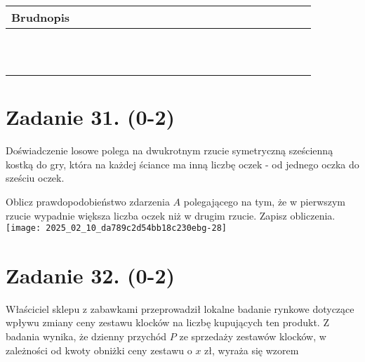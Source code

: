 \documentclass[10pt]{article}
\begin{document}
\begin{center}
\begin{tabular}{|c|c|c|c|c|c|c|c|c|c|c|c|c|c|c|c|c|c|c|c|c|c|c|c|c|}
\hline
\multicolumn{4}{|l|}{Brudnopis} &  &  &  &  &  &  &  &  &  &  &  &  &  &  &  &  &  &  &  &  &  \\
\hline
 &  &  &  &  &  &  &  &  &  &  &  &  &  &  &  &  &  &  &  &  &  &  &  &  \\
\hline
 &  &  &  &  &  &  &  &  &  &  &  &  &  &  &  &  &  &  &  &  &  &  &  &  \\
\hline
 &  &  &  &  &  &  &  &  &  &  &  &  &  &  &  &  &  &  &  &  &  &  &  &  \\
\hline
 &  &  &  &  &  &  &  &  &  &  &  &  &  &  &  &  &  &  &  &  &  &  &  &  \\
\hline
 &  &  &  &  &  &  &  &  &  &  &  &  &  &  &  &  &  &  &  &  &  &  &  &  \\
\hline
 &  &  &  &  &  &  &  &  &  &  &  &  &  &  &  &  &  &  &  &  &  &  &  &  \\
\hline
 &  &  &  &  &  &  &  &  &  &  &  &  &  &  &  &  &  &  &  &  &  &  &  &  \\
\hline
 &  &  &  &  &  &  &  &  &  &  &  &  &  &  &  &  &  &  &  &  &  &  &  &  \\
\hline
 &  &  &  &  &  &  &  &  &  &  &  &  &  &  &  &  &  &  &  &  &  &  &  &  \\
\hline
 &  &  &  &  &  &  &  &  &  &  &  &  &  &  &  &  &  &  &  &  &  &  &  &  \\
\hline
 &  &  &  &  &  &  &  &  &  &  &  &  &  &  &  &  &  &  &  &  &  &  &  &  \\
\hline
\end{tabular}
\end{center}

\section*{Zadanie 31. (0-2)}
Doświadczenie losowe polega na dwukrotnym rzucie symetryczną sześcienną kostką do gry, która na każdej ściance ma inną liczbę oczek - od jednego oczka do sześciu oczek.

Oblicz prawdopodobieństwo zdarzenia \(A\) polegającego na tym, że w pierwszym rzucie wypadnie większa liczba oczek niż w drugim rzucie. Zapisz obliczenia.\\
\texttt{[image: 2025\_02\_10\_da789c2d54bb18c230ebg-28]}

\section*{Zadanie 32. (0-2)}
Właściciel sklepu z zabawkami przeprowadził lokalne badanie rynkowe dotyczące wpływu zmiany ceny zestawu klocków na liczbę kupujących ten produkt. Z badania wynika, że dzienny przychód \(P\) ze sprzedaży zestawów klocków, w zależności od kwoty obniżki ceny zestawu o \(x\) zł, wyraża się wzorem
\end{document}

